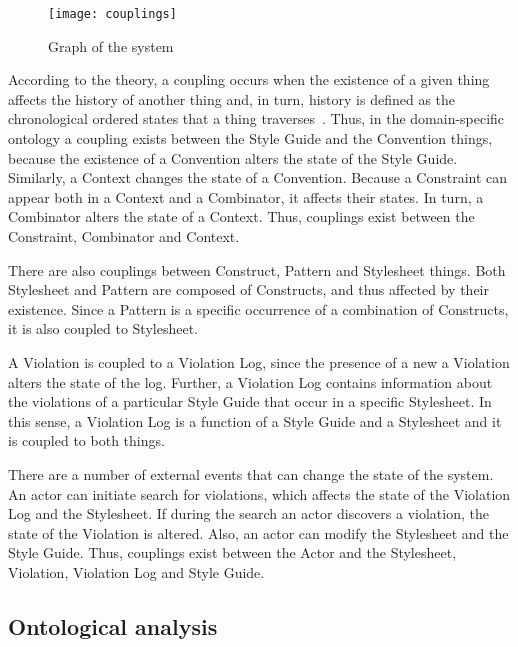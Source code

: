 \begin{figure}[h]
  \centering
  \caption{Graph of the system}
  \label{fig:couplings}
  \texttt{[image: couplings]}
\end{figure}

According to the theory, a coupling occurs when the existence of a given thing affects the history
of another thing and, in turn, history is defined as the chronological ordered states that a thing
traverses~\cite{wand1990ontological}. Thus, in the domain-specific ontology a coupling exists
between the Style Guide and the Convention things, because the existence of a Convention alters the
state of the Style Guide. Similarly, a Context changes the state of a Convention. Because a
Constraint can appear both in a Context and a Combinator, it affects their states. In turn, a
Combinator alters the state of a Context. Thus, couplings exist between the Constraint, Combinator
and Context.

There are also couplings between Construct, Pattern and Stylesheet things. Both Stylesheet and
Pattern are composed of Constructs, and thus affected by their existence. Since a Pattern is a
specific occurrence of a combination of Constructs, it is also coupled to Stylesheet.

A Violation is coupled to a Violation Log, since the presence of a new a Violation alters the state
of the log. Further, a Violation Log contains information about the violations of a particular Style
Guide that occur in a specific Stylesheet. In this sense, a Violation Log is a function of a Style
Guide and a Stylesheet and it is coupled to both things.

There are a number of external events that can change the state of the system. An actor can initiate
search for violations, which affects the state of the Violation Log and the Stylesheet. If during
the search an actor discovers a violation, the state of the Violation is altered. Also, an actor can
modify the Stylesheet and the Style Guide. Thus, couplings exist between the Actor and the
Stylesheet, Violation, Violation Log and Style Guide.

\subsection{Ontological analysis}

